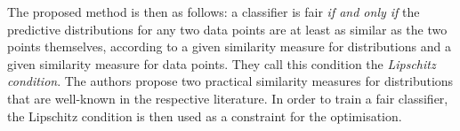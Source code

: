 The proposed method is then as follows: a classifier is fair \emph{if and only if} the predictive
distributions for any two data points are at least as similar as the two points themselves,
according to a given similarity measure for distributions and a given similarity measure for data
points. They call this condition the \emph{Lipschitz condition}. The authors propose two practical
similarity measures for distributions that are well-known in the respective literature. In order to
train a fair classifier, the Lipschitz condition is then used as a constraint for the optimisation.



